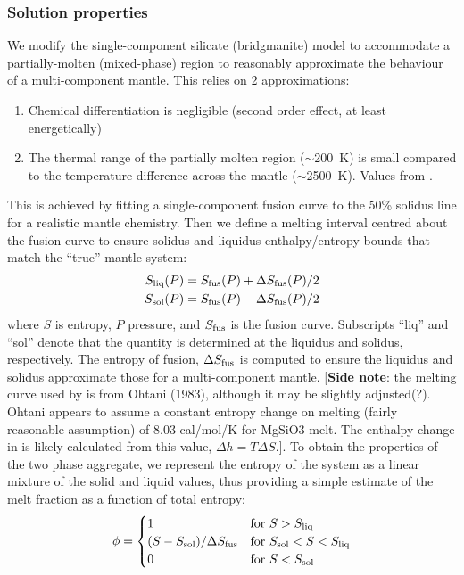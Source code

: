 \subsubsection{Solution properties}
We modify the single-component silicate (bridgmanite) model to accommodate a partially-molten (mixed-phase) region to reasonably approximate the behaviour of a multi-component mantle.  This relies on 2 approximations: 
\begin{enumerate}
\item Chemical differentiation is negligible (second order effect, at least energetically)
\item The thermal range of the partially molten region ($\sim$200~K) is small compared to the temperature difference across the mantle ($\sim$2500~K). Values from \cite{SKS09}.
\end{enumerate}
This is achieved by fitting a single-component fusion curve to the 50\% solidus line for a realistic mantle chemistry.  Then we define a melting interval centred about the fusion curve to ensure solidus and liquidus enthalpy/entropy bounds that match the ``true'' mantle system:
\begin{equation}
\begin{split}
S_{\rm liq}(P) &= S_{\rm fus}(P) + \Delta S_{\rm fus}(P) / 2 \\
S_{\rm sol}(P) &= S_{\rm fus}(P) - \Delta S_{\rm fus}(P) / 2
\end{split}
\label{eqn:fusion_curve}
\end{equation}
where $S$ is entropy, $P$ pressure, and $S_{\rm fus}$ is the fusion curve.  Subscripts ``liq'' and ``sol'' denote that the quantity is determined at the liquidus and solidus, respectively.  The entropy of fusion, $\Delta S_{\rm fus}$ is computed to ensure the liquidus and solidus approximate those for a multi-component mantle.  [\textbf{Side note}: the melting curve used by \cite{ABE93} is from Ohtani (1983), although it may be slightly adjusted(?).  Ohtani appears to assume a constant entropy change on melting (fairly reasonable assumption) of 8.03 cal/mol/K for MgSiO3 melt.  The enthalpy change in \cite{ABE93} is likely calculated from this value, $\Delta h = T \Delta S$.]. To obtain the properties of the two phase aggregate, we represent the entropy of the system as a linear mixture of the solid and liquid values, thus providing a simple estimate of the melt fraction as a function of total entropy:
\begin{equation}
\phi=
\begin{cases}
  1 & \text{for } S>S_{\rm liq} \\
  (S-S_{\rm sol}) / \Delta S_{\rm fus} & \text{for } S_{\rm sol}<S<S_{\rm liq} \\  
  0 & \text{for }  S<S_{\rm sol}
\end{cases}
\end{equation}
